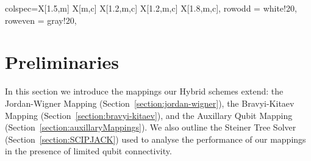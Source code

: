 \documentclass[pdftex,pra,aps,twocolumn,twoside]{revtex4-1}
\theoremstyle{plain}
\theoremstyle{note}
\newcommand\+{{\footnotesize \raisebox{0.3ex}{+}}}
\begin{document}
\begin{table}[hbpt]
\begin{tblr}{colspec={X[1.5,m] X[m,c] X[1.2,m,c] X[1.2,m,c] X[1.8,m,c]}, row{odd} = {white!20},
        row{even} = {gray!20},}
    \end{tblr}
    \caption{\justifying Comparison of the performance (on an $N \times N$ square-lattice fermionic interaction graph) of select families of fermion-to-qubit mappings including state-of-the-art alongside our novel mapping $n\times n$ Hybrid and Hybrid\+ mappings  for $n \ll N$.  $B_k$ and $\bar{B}_k$ represent the $O(\log k)$ maximum and average Pauli-weight of fermionic operators under the Bravyi-Kitaev mapping on $k$ fermionic modes. For each hybrid mapping $n$ is fixed. For $n=1$ the Hybrid mapping is equivalent to the Jordan-Wigner mapping, and the Hybrid\+ mapping is equivalent to AQM. For $n=N$ both are equivalent to the Bravyi-Kitaev mapping. Intermediate values of $n$ combine the strengths of these mappings to give improved performance. The optimal choice of $n$ is dependant upon $N$ and must be found numerically (Figures~\ref{fig:vary_cell_sizes_32},\ref{fig:vary_cell_sizes_64}). For $N=64$, the optimal choice is $n=8$. The $8 \times 8$ Hybrid mapping gives 98\% shorter Pauli-strings than the Jordan-Wigner mapping, and the $8 \times 8$ Hybrid\+ mapping only requires 1.016 qubits per fermion. This is 94\% fewer ancillae than the super-compact mapping (which requires the fewest ancillas of all known local mappings). *These values are estimated using numerical evaluation. }
    \label{tab:my_label}
    
\end{table}
\section{Preliminaries}
 In this section we introduce the mappings our Hybrid schemes extend: the Jordan-Wigner Mapping (Section~\ref{section:jordan-wigner}), the Bravyi-Kitaev Mapping (Section~\ref{section:bravyi-kitaev}), and the Auxillary Qubit Mapping (Section~\ref{section:auxillaryMappings}). We also outline the Steiner Tree Solver (Section~\ref{section:SCIPJACK}) used to analyse the performance of our mappings in the presence of limited qubit connectivity.
\end{document}
